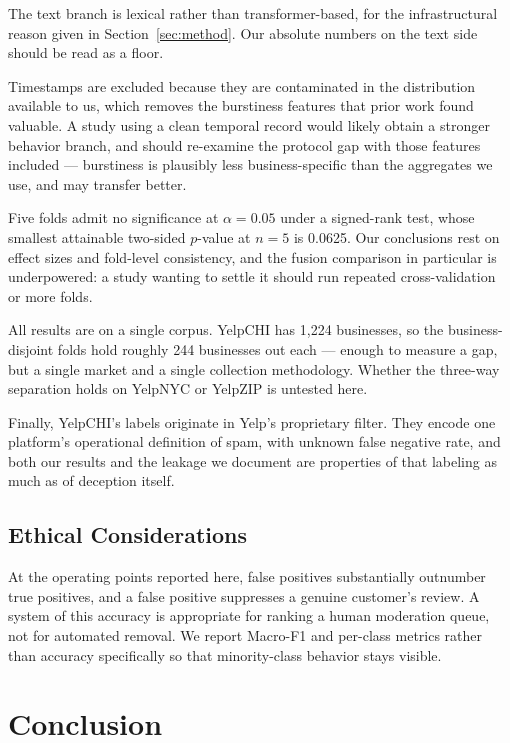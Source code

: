 \documentclass[conference]{IEEEtran}
\begin{document}
The text branch is lexical rather than transformer-based, for the
infrastructural reason given in Section~\ref{sec:method}. Our absolute numbers on
the text side should be read as a floor.

Timestamps are excluded because they are contaminated in the distribution
available to us, which removes the burstiness features that prior work found
valuable. A study using a clean temporal record would likely obtain a stronger
behavior branch, and should re-examine the protocol gap with those features
included --- burstiness is plausibly less business-specific than the aggregates
we use, and may transfer better.

Five folds admit no significance at $\alpha = 0.05$ under a signed-rank test,
whose smallest attainable two-sided $p$-value at $n = 5$ is 0.0625. Our
conclusions rest on effect sizes and fold-level consistency, and the fusion
comparison in particular is underpowered: a study wanting to settle it should
run repeated cross-validation or more folds.

All results are on a single corpus. YelpCHI has 1{,}224 businesses, so the
business-disjoint folds hold roughly 244 businesses out each --- enough to
measure a gap, but a single market and a single collection methodology.
Whether the three-way separation holds on YelpNYC or YelpZIP is untested here.

Finally, YelpCHI's labels originate in Yelp's proprietary filter. They encode
one platform's operational definition of spam, with unknown false negative
rate, and both our results and the leakage we document are properties of that
labeling as much as of deception itself.

\subsection{Ethical Considerations}

At the operating points reported here, false positives substantially outnumber
true positives, and a false positive suppresses a genuine customer's review. A
system of this accuracy is appropriate for ranking a human moderation queue, not
for automated removal. We report Macro-F1 and per-class metrics rather than
accuracy specifically so that minority-class behavior stays visible.


\section{Conclusion}
\label{sec:conclusion}
\end{document}
